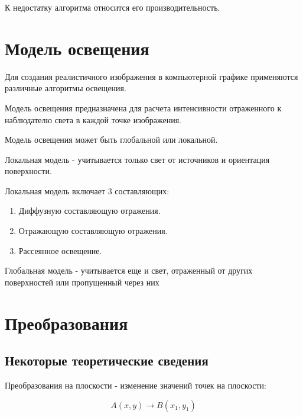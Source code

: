 К недостатку алгоритма относится его производительность.

\section {Модель освещения}

Для создания реалистичного изображения в компьютерной графике применяются различные алгоритмы освещения.

Модель освещения предназначена для расчета интенсивности
отраженного к наблюдателю света в каждой точке изображения.

Модель освещения может быть глобальной или локальной.

Локальная модель - учитывается только свет от источников и ориентация поверхности.

Локальная модель включает 3 составляющих:

\begin{enumerate}
	\item Диффузную составляющую отражения.
	\item Отражающую составляющую отражения.
	\item Рассеянное освещение.
\end{enumerate}

Глобальная модель - учитывается еще и свет, отраженный от других поверхностей или пропущенный через них



\section {Преобразования}

\subsection {Некоторые теоретические сведения}

Преобразования на плоскости - изменение значений точек на плоскости:

\begin{equation}
	A(x,y)\rightarrow B(x_1,y_1)
\end{equation}

